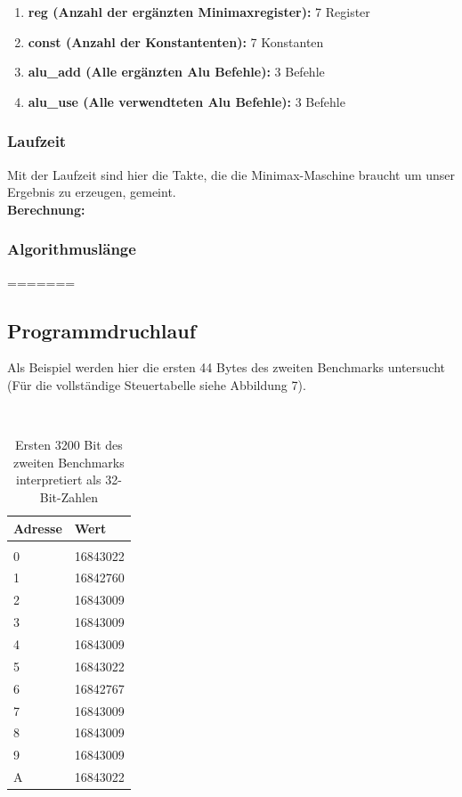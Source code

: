 \documentclass[12pt,titlepage]{article}
\begin{document}
\begin{enumerate}
\item \textbf{reg (Anzahl der ergänzten Minimaxregister): } 7 Register
\item \textbf{const (Anzahl der Konstantenten): } 7 Konstanten
\item \textbf{alu_add (Alle erg{\"a}nzten Alu Befehle): } 3 Befehle
\item \textbf{alu_use (Alle verwendteten Alu Befehle): } 3 Befehle
\end{enumerate}

\subsubsection{Laufzeit}
Mit der Laufzeit sind hier die Takte, die die Minimax-Maschine braucht um unser Ergebnis zu erzeugen, gemeint.\\

\textbf{Berechnung:} 

\subsubsection{Algorithmuslänge}


=======
\newpage

\subsection{Programmdruchlauf}
Als Beispiel werden hier die ersten 44 Bytes des zweiten Benchmarks untersucht (Für die vollständige Steuertabelle siehe Abbildung 7).

\leavevmode \\

\begin{table}[h!]
    \begin{tabular}{l|l}
    Adresse & Wert            \\
    \hline                    \\
    0     & 16843022  \\
    1     & 16842760  \\
    2     & 16843009  \\
    3     & 16843009  \\
    4     & 16843009  \\
    5     & 16843022  \\
    6     & 16842767  \\
    7     & 16843009  \\
    8     & 16843009  \\
    9     & 16843009  \\
    A     & 16843022  \\
    \end{tabular}
    \caption{Ersten 3200 Bit des zweiten Benchmarks interpretiert als 32-Bit-Zahlen}
\end{table}
\end{document}
